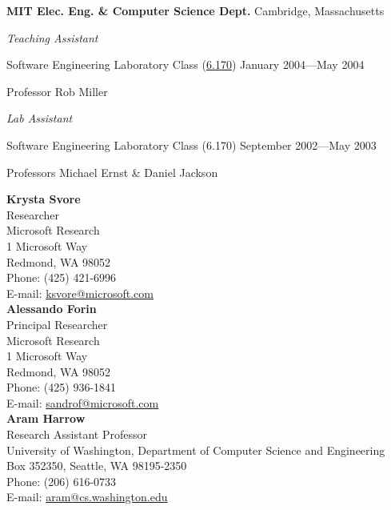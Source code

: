 \documentclass[letter]{article}
\begin{document}
\vspace{\baselineskip}
\par
{\bf MIT Elec. Eng. \& Computer Science Dept.} \hfill Cambridge, Massachusetts

\vspace{0.5\baselineskip}
\par
{\em Teaching Assistant}
\par
Software Engineering Laboratory Class (\href{http://courses.csail.mit.edu/6.170/old-www/2004-Spring/admin-info/generalinfo.html#Staff}{6.170}) \hfill January 2004---May 2004
\par
Professor Rob Miller

\vspace{0.5\baselineskip}
\par
{\em Lab Assistant}
\par
Software Engineering Laboratory Class (6.170) \hfill September 2002---May 2003
\par
Professors Michael Ernst \& Daniel Jackson
\par

\vspace{\baselineskip}
\newpage

{\bf Krysta Svore}
\\
Researcher\\
Microsoft Research\\
1 Microsoft Way\\
Redmond, WA 98052\\
Phone: (425) 421-6996\\
E-mail: \url{ksvore@microsoft.com}\\

{\bf Alessando Forin}\\
Principal Researcher\\
Microsoft Research\\
1 Microsoft Way\\
Redmond, WA 98052\\
Phone: (425) 936-1841\\
E-mail: \url{sandrof@microsoft.com}\\

{\bf Aram Harrow}\\
Research Assistant Professor\\
University of Washington, Department of Computer Science and Engineering\\
Box 352350, Seattle, WA 98195-2350\\
Phone: (206) 616-0733\\
E-mail: \url{aram@cs.washington.edu}\\
\end{document}
